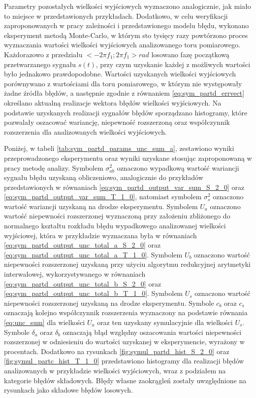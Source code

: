 Parametry pozostałych wielkości wyjściowych wyznaczono analogicznie, jak miało to miejsce w przedstawionych przykładach. Dodatkowo, w celu weryfikacji zaproponowanych w pracy zależności i przedstawionego modelu błędu, wykonano eksperyment metodą Monte-Carlo, w którym sto tysięcy razy powtórzono proces wyznaczania wartości wielkości wyjściowych analizowanego toru pomiarowego. Każdorazowo z przedziału $<-2 \pi f_{1};2 \pi f_{1}>\unit{rad}$ losowano fazę początkową przetwarzanego sygnału $s(t)$, przy czym uzyskanie każdej z możliwych wartości było jednakowo prawdopodobne. Wartości uzyskanych wielkości wyjściowych porównywano z wartościami dla toru pomiarowego, w którym nie występowały żadne źródła błędów, a następnie zgodnie z równaniem \eqref{eq:sym_partd_errvect} określano aktualną realizacje wektora błędów wielkości wyjściowych. Na podstawie uzyskanych realizacji sygnałów błędów sporządzano histogramy, które pozwalały oszacować wariancję, niepewność rozszerzoną oraz współczynnik rozszerzenia dla analizowanych wielkości wyjściowych.

Poniżej, w tabeli \ref{tab:sym_partd_params_unc_sum_a}, zestawiono wyniki przeprowadzonego eksperymentu oraz wyniki uzyskane stosując zaproponowaną w pracy metodę analizy. Symbolem $\sigma_{ab}^{2}$ oznaczono wypadkową wartość wariancji sygnału błędu uzyskaną obliczeniowo, analogicznie do przykładów przedstawionych w równaniach \eqref{eq:sym_partd_output_var_sum_S_2_0} oraz \eqref{eq:sym_partd_output_var_sum_T_1_0}, natomiast symbolem $\sigma_{s}^{2}$ oznaczono wartość wariancji uzyskaną na drodze eksperymentu. Symbolem $U_{a}$ oznaczono wartość niepewności rozszerzonej wyznaczoną przy założeniu zbliżonego do normalnego kształtu rozkładu błędu wypadkowego analizowanej wielkości wyjściowej, która w przykładzie wyznaczana była w równaniach \eqref{eq:sym_partd_output_unc_total_a_S_2_0} oraz \eqref{eq:sym_partd_output_unc_total_a_T_1_0}. Symbolem $U_{b}$ oznaczono wartość niepewności rozszerzonej uzyskaną przy użyciu algorytmu redukcyjnej arytmetyki interwałowej, wykorzystywanego w równaniach \eqref{eq:sym_partd_output_unc_total_b_S_2_0} oraz \eqref{eq:sym_partd_output_unc_total_b_T_1_0}. Symbolem $U_{s}$ oznaczono wartość niepewności rozszerzonej uzyskaną na drodze eksperymentu. Symbole $c_{b}$ oraz $c_{s}$ oznaczają kolejno współczynnik rozszerzenia wyznaczony na podstawie równania \eqref{eq:unc_sum} dla wielkości $U_{a}$ oraz ten uzyskany symulacyjnie dla wielkości $U_{s}$. Symbole $\delta_{a}$ oraz $\delta_{b}$ oznaczają błąd względny oszacowania wartości niepewności rozszerzonej w odniesieniu do wartości uzyskanej w eksperymencie, wyrażony w procentach. Dodatkowo na rysunkach \ref{fig:symul_partd_hist_S_2_0} oraz \ref{fig:symul_partc_hist_T_1_0} przedstawiono histogramy dla realizacji błędów analizowanych w przykładzie wielkości wyjściowych, wraz z podziałem na kategorie błędów składowych. Błędy własne zaokrągleń zostały uwzględnione na rysunkach jako składowe błędów losowych.

